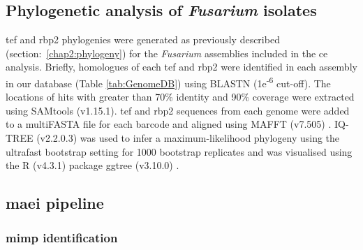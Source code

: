 \bigskip

\bigskip

\newpage

\subsection{Phylogenetic analysis of \textit{Fusarium} isolates}

\Ac{tef} and \ac{rbp2} phylogenies were generated as previously described (section:~\ref{chap2:phylogeny}) for the \textit{Fusarium} assemblies included in the \ac{ce} analysis. Briefly, homologues of each \ac{tef} and \ac{rbp2} were identified in each assembly in our database  (Table \ref{tab:GenomeDB}) using BLASTN (1e\textsuperscript{-6} cut-off). The locations of hits with greater than 70\% identity and 90\% coverage were extracted using SAMtools (v1.15.1). \Ac{tef} and \ac{rbp2} sequences from each genome were added to a  multiFASTA file for each barcode and aligned using MAFFT (v7.505) \parencite{Katoh2019}. IQ-TREE (v2.2.0.3) \parencite{Nguyen2015} was used to infer a maximum-likelihood phylogeny using the ultrafast bootstrap setting for 1000 bootstrap replicates and was visualised using the R \parencite{R} (v4.3.1) package ggtree (v3.10.0) \parencite{ggtree}.

\subsection{\acf{maei} pipeline}

\subsubsection{\Ac{mimp} identification}

